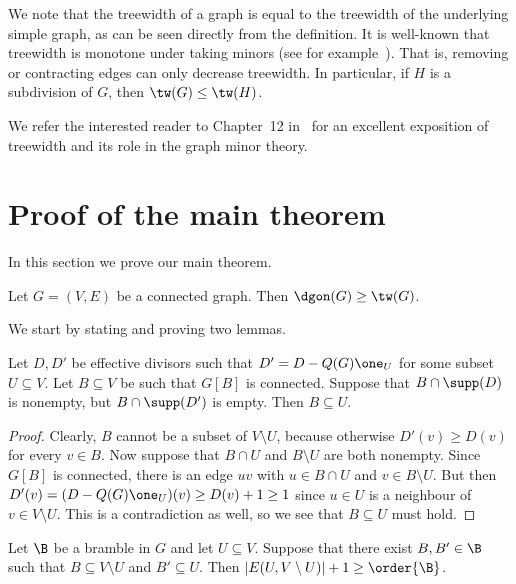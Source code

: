 \begin{rema}
We note that the treewidth of a graph is equal to the treewidth of the underlying simple graph, as can be seen directly from the definition. It is well-known that treewidth is monotone under taking minors (see for example~\cite{DiestelGraphTheory}). That is, removing or contracting edges can only decrease treewidth. In particular, if $H$ is a subdivision of $G$, then $\tw(G)\leq \tw(H)$. 


\end{rema}
We refer the interested reader to Chapter~12 in~\cite{DiestelGraphTheory} for an excellent exposition of treewidth and its role in the graph minor theory.

\section{Proof of the main theorem}
In this section we prove our main theorem.
\begin{theorem}\label{main}
Let $G=(V,E)$ be a connected graph. Then $\dgon(G)\geq \tw(G)$.
\end{theorem} 

We start by stating and proving two lemmas.
\begin{lemma}\label{oneside}
Let $D,D'$ be effective divisors such that $D'=D-Q(G)\one_U$ for some subset $U\subseteq V$. Let $B\subseteq V$ be such that $G[B]$ is connected. Suppose that $B\cap \supp(D)$ is nonempty, but $B\cap \supp(D')$ is empty. Then $B\subseteq U$.
\end{lemma}
\begin{proof}
Clearly, $B$ cannot be a subset of $V\setminus U$, because otherwise $D'(v)\geq D(v)$ for every $v\in B$. Now suppose that $B\cap U$ and $B\setminus U$ are both nonempty. Since $G[B]$ is connected, there is an edge $uv$ with $u\in B\cap U$ and $v\in B\setminus U$. But then $D'(v)=(D-Q(G)\one_U)(v)\geq D(v)+1\geq 1$ since $u\in U$ is a neighbour of $v\in V\setminus U$. This is a contradiction as well, so we see that $B\subseteq U$ must hold.
\end{proof}

\begin{lemma}\label{brambleseparation}
Let $\B$ be a bramble in $G$ and let $U\subseteq V$. Suppose that there exist $B,B'\in \B$ such that $B\subseteq V\setminus U$ and $B'\subseteq U$. Then $|E(U,V\setminus U)|+1\geq \order{\B}$.
\end{lemma}

